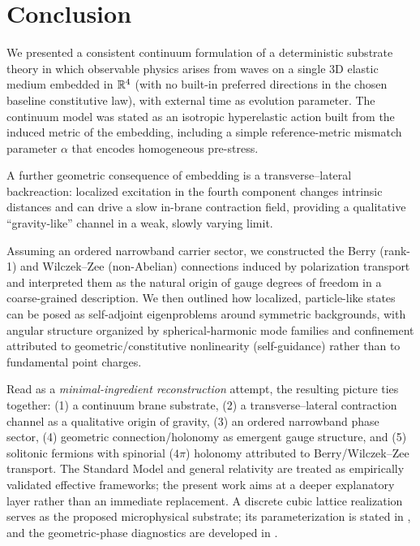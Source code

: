 \section{Conclusion}
\label{sec:conclusion}

We presented a consistent continuum formulation of a deterministic substrate theory in which
observable physics arises from waves on a single 3D elastic medium embedded in $\mathbb{R}^4$ (with no built-in preferred directions in the chosen baseline constitutive law),
with external time as evolution parameter.
The continuum model was stated as an isotropic hyperelastic action built from the induced metric of the embedding,
including a simple reference-metric mismatch parameter $\alpha$ that encodes homogeneous pre-stress.

A further geometric consequence of embedding is a transverse--lateral backreaction: localized excitation in the
fourth component changes intrinsic distances and can drive a slow in-brane contraction field, providing a qualitative
``gravity-like'' channel in a weak, slowly varying limit.

Assuming an ordered narrowband carrier sector, we constructed the Berry (rank-1) and Wilczek--Zee (non-Abelian)
connections induced by polarization transport and interpreted them as the natural origin of gauge degrees of freedom
in a coarse-grained description.
We then outlined how localized, particle-like states can be posed as self-adjoint eigenproblems around symmetric
backgrounds, with angular structure organized by spherical-harmonic mode families and confinement attributed to
geometric/constitutive nonlinearity (self-guidance) rather than to fundamental point charges.

Read as a \emph{minimal-ingredient reconstruction} attempt, the resulting picture ties together:
(1) a continuum brane substrate,
(2) a transverse--lateral contraction channel as a qualitative origin of gravity,
(3) an ordered narrowband phase sector,
(4) geometric connection/holonomy as emergent gauge structure,
and (5) solitonic fermions with spinorial ($4\pi$) holonomy attributed to Berry/Wilczek--Zee transport.
The Standard Model and general relativity are treated as empirically validated effective frameworks;
the present work aims at a deeper explanatory layer rather than an immediate replacement.
A discrete cubic lattice realization serves as the proposed microphysical substrate; its parameterization is stated
in , and the geometric-phase diagnostics are developed in .
